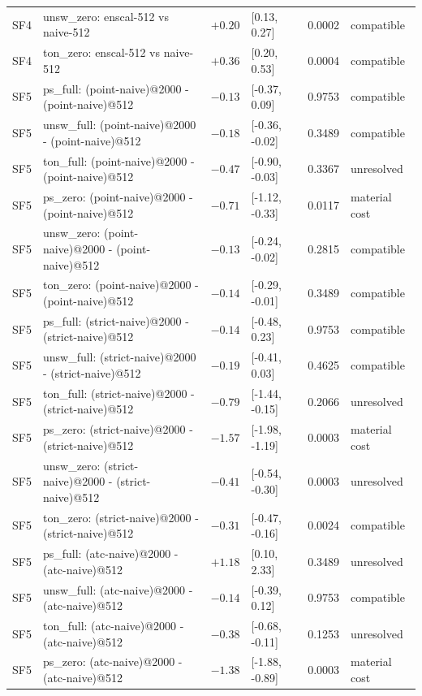 \begin{table}[t]
\begin{tabular}{l l r l r l}
SF4 & unsw\_zero: enscal-512 vs naive-512 & $+0.20$ & [0.13, 0.27] & 0.0002 & compatible \\
SF4 & ton\_zero: enscal-512 vs naive-512 & $+0.36$ & [0.20, 0.53] & 0.0004 & compatible \\
SF5 & ps\_full: (point-naive)@2000 - (point-naive)@512 & $-0.13$ & [-0.37, 0.09] & 0.9753 & compatible \\
SF5 & unsw\_full: (point-naive)@2000 - (point-naive)@512 & $-0.18$ & [-0.36, -0.02] & 0.3489 & compatible \\
SF5 & ton\_full: (point-naive)@2000 - (point-naive)@512 & $-0.47$ & [-0.90, -0.03] & 0.3367 & unresolved \\
SF5 & ps\_zero: (point-naive)@2000 - (point-naive)@512 & $-0.71$ & [-1.12, -0.33] & 0.0117 & material cost \\
SF5 & unsw\_zero: (point-naive)@2000 - (point-naive)@512 & $-0.13$ & [-0.24, -0.02] & 0.2815 & compatible \\
SF5 & ton\_zero: (point-naive)@2000 - (point-naive)@512 & $-0.14$ & [-0.29, -0.01] & 0.3489 & compatible \\
SF5 & ps\_full: (strict-naive)@2000 - (strict-naive)@512 & $-0.14$ & [-0.48, 0.23] & 0.9753 & compatible \\
SF5 & unsw\_full: (strict-naive)@2000 - (strict-naive)@512 & $-0.19$ & [-0.41, 0.03] & 0.4625 & compatible \\
SF5 & ton\_full: (strict-naive)@2000 - (strict-naive)@512 & $-0.79$ & [-1.44, -0.15] & 0.2066 & unresolved \\
SF5 & ps\_zero: (strict-naive)@2000 - (strict-naive)@512 & $-1.57$ & [-1.98, -1.19] & 0.0003 & material cost \\
SF5 & unsw\_zero: (strict-naive)@2000 - (strict-naive)@512 & $-0.41$ & [-0.54, -0.30] & 0.0003 & unresolved \\
SF5 & ton\_zero: (strict-naive)@2000 - (strict-naive)@512 & $-0.31$ & [-0.47, -0.16] & 0.0024 & compatible \\
SF5 & ps\_full: (atc-naive)@2000 - (atc-naive)@512 & $+1.18$ & [0.10, 2.33] & 0.3489 & unresolved \\
SF5 & unsw\_full: (atc-naive)@2000 - (atc-naive)@512 & $-0.14$ & [-0.39, 0.12] & 0.9753 & compatible \\
SF5 & ton\_full: (atc-naive)@2000 - (atc-naive)@512 & $-0.38$ & [-0.68, -0.11] & 0.1253 & unresolved \\
SF5 & ps\_zero: (atc-naive)@2000 - (atc-naive)@512 & $-1.38$ & [-1.88, -0.89] & 0.0003 & material cost \\

\end{tabular}
\end{table}
